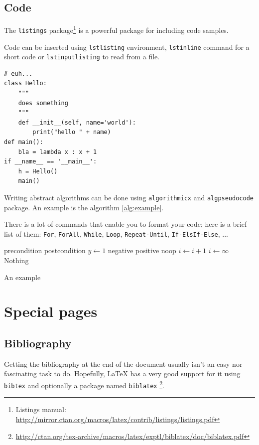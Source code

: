 \subsection{Code}

The \texttt{listings} package\footnote{%
Listings manual:
\url{http://mirror.ctan.org/macros/latex/contrib/listings/listings.pdf}}
is a powerful package for including code samples.

Code can be inserted using \texttt{lstlisting} environment, \texttt{lstinline}
command for a short code or \texttt{lstinputlisting} to read from a file.

\begin{lstlisting}[style=python]
# euh...
class Hello:
	"""
	does something
	"""
	def __init__(self, name='world'):
		print("hello " + name)
def main():
	bla = lambda x : x + 1
if __name__ == '__main__':
	h = Hello()
	main()
\end{lstlisting}

Writing abstract algorithms can be done using \texttt{algorithmicx} and
\texttt{algpseudocode} package.
An example is the algorithm \ref{alg:example}.

There is a lot of commands that enable you to format your code;
here is a brief list of them:
\texttt{For}, \texttt{ForAll}, \texttt{While}, \texttt{Loop},
\texttt{Repeat-Until}, \texttt{If-ElsIf-Else}, ...

\begin{algorithm}[H]
\begin{algorithmic}[1]
\Require precondition
\Ensure postcondition
\State $y \gets 1$
	\State negative
	\State positive
\Else
	\State noop
\EndIf
{}
	\State $i \gets i + 1$
\EndFor
\Loop
	\State $i \gets \infty$
	\State {}
\EndLoop
\Statex
{}
	\State \Return Nothing
\EndFunction
\end{algorithmic}
\caption{An example}
\label{alg:example}
\end{algorithm}

\section{Special pages}

\subsection{Bibliography}

Getting the bibliography at the end of the document usually isn't an easy nor
fascinating task to do.
Hopefully, \LaTeX{} has a very good support for it using \texttt{bibtex} and
optionally a package named \texttt{biblatex}%
\footnote{\url{http://ctan.org/tex-archive/macros/latex/exptl/biblatex/doc/biblatex.pdf}}.


